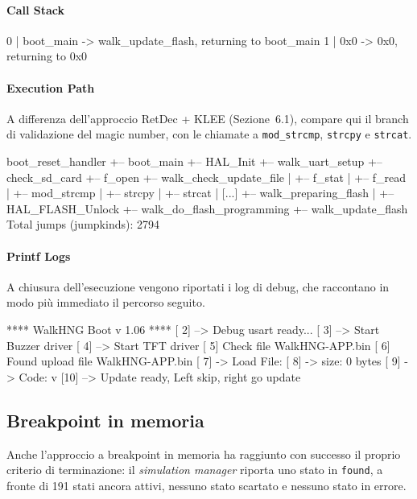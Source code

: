 \paragraph{Call Stack}

\begin{bashcode}
0 | boot_main -> walk_update_flash, returning to boot_main
1 | 0x0 -> 0x0, returning to 0x0
\end{bashcode}

        \paragraph{Execution Path}
        
        A differenza dell'approccio RetDec + KLEE (Sezione~6.1), compare qui il 
        branch di validazione del magic number, con le chiamate a 
        \texttt{mod\_strcmp}, \texttt{strcpy} e \texttt{strcat}.

\begin{bashcode}
boot_reset_handler
+-- boot_main
    +-- HAL_Init
    +-- walk_uart_setup
    +-- check_sd_card
    +-- f_open
    +-- walk_check_update_file
    |   +-- f_stat
    |   +-- f_read
    |   +-- mod_strcmp
    |   +-- strcpy
    |   +-- strcat
    |   [...]
    +-- walk_preparing_flash
    |   +-- HAL_FLASH_Unlock
    +-- walk_do_flash_programming
    +-- walk_update_flash
Total jumps (jumpkinds): 2794
\end{bashcode}

        \paragraph{Printf Logs}
        
        A chiusura dell'esecuzione vengono riportati i log di debug, che 
        raccontano in modo più immediato il percorso seguito.

\begin{bashcode}
[ 1] **** WalkHNG Boot v 1.06 ****
[ 2] --> Debug usart ready...
[ 3] --> Start Buzzer driver
[ 4] --> Start TFT driver
[ 5] Check file WalkHNG-APP.bin
[ 6] Found upload file WalkHNG-APP.bin
[ 7] -> Load File:
[ 8] -> size: 0 bytes
[ 9] -> Code:  v
[10] --> Update ready, Left skip, right go update
\end{bashcode}

    \subsection{Breakpoint in memoria}
    \label{subsec:risultati_breakpoint_memoria}
    Anche l'approccio a breakpoint in memoria ha raggiunto con successo il proprio criterio di terminazione: il \textit{simulation manager} riporta uno stato in \texttt{found}, a fronte di 191 stati ancora attivi, nessuno stato scartato e nessuno stato in errore.

